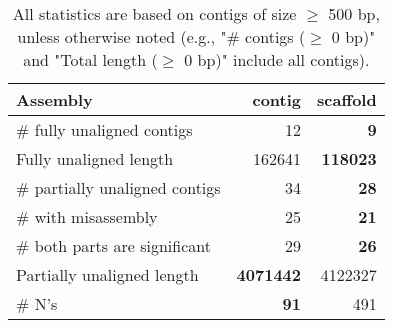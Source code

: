 \documentclass[12pt,a4paper]{article}
\begin{document}
\begin{table}[ht]
\begin{center}
\caption{All statistics are based on contigs of size $\geq$ 500 bp, unless otherwise noted (e.g., "\# contigs ($\geq$ 0 bp)" and "Total length ($\geq$ 0 bp)" include all contigs).}
\begin{tabular}{|l*{2}{|r}|}
\hline
Assembly & contig & scaffold \\ \hline
\# fully unaligned contigs & 12 & {\bf 9} \\ \hline
Fully unaligned length & 162641 & {\bf 118023} \\ \hline
\# partially unaligned contigs & 34 & {\bf 28} \\ \hline
\hspace{5mm}\# with misassembly & 25 & {\bf 21} \\ \hline
\hspace{5mm}\# both parts are significant & 29 & {\bf 26} \\ \hline
Partially unaligned length & {\bf 4071442} & 4122327 \\ \hline
\# N's & {\bf 91} & 491 \\ \hline
\end{tabular}
\end{center}
\end{table}
\end{document}
